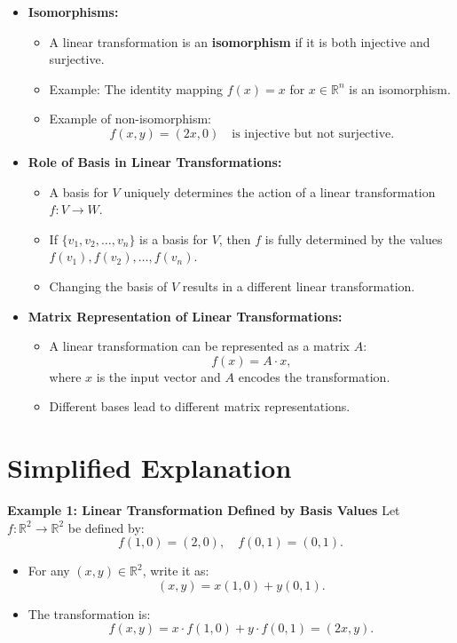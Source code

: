 \documentclass{article}
\begin{document}
\begin{itemize}
  \item \textbf{Isomorphisms:}
    \begin{itemize}
      \item A linear transformation is an \textbf{isomorphism} if it is both injective and surjective.
      \item Example: The identity mapping $f(x) = x$ for $x \in \mathbb{R}^n$ is an isomorphism.
      \item Example of non-isomorphism:
        \[
          f(x, y) = (2x, 0) \quad \text{is injective but not surjective.}
        \]
    \end{itemize}

  \item \textbf{Role of Basis in Linear Transformations:}
    \begin{itemize}
      \item A basis for $V$ uniquely determines the action of a linear transformation $f: V \to W$.
      \item If $\{v_1, v_2, \dots, v_n\}$ is a basis for $V$, then $f$ is fully determined by the values $f(v_1), f(v_2), \dots, f(v_n)$.
      \item Changing the basis of $V$ results in a different linear transformation.
    \end{itemize}

  \item \textbf{Matrix Representation of Linear Transformations:}
    \begin{itemize}
      \item A linear transformation can be represented as a matrix $A$:
        \[
          f(x) = A \cdot x,
        \]
        where $x$ is the input vector and $A$ encodes the transformation.
      \item Different bases lead to different matrix representations.
    \end{itemize}
\end{itemize}

\section*{Simplified Explanation}

\textbf{Example 1: Linear Transformation Defined by Basis Values}
Let $f: \mathbb{R}^2 \to \mathbb{R}^2$ be defined by:
\[
  f(1, 0) = (2, 0), \quad f(0, 1) = (0, 1).
\]
\begin{itemize}
  \item For any $(x, y) \in \mathbb{R}^2$, write it as:
    \[
      (x, y) = x(1, 0) + y(0, 1).
    \]
  \item The transformation is:
    \[
      f(x, y) = x \cdot f(1, 0) + y \cdot f(0, 1) = (2x, y).
    \]
\end{itemize}
\end{document}
